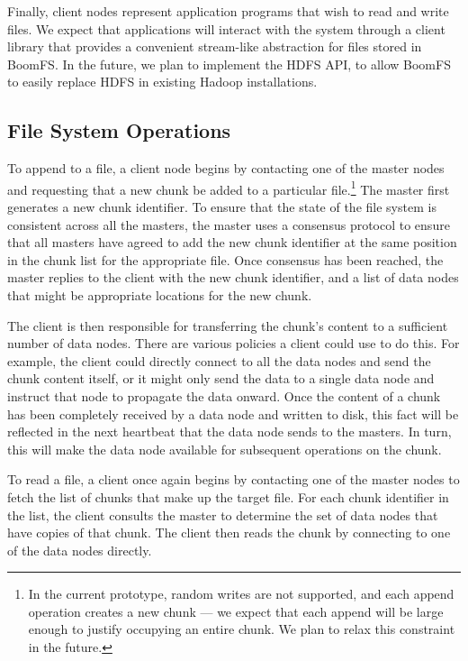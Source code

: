 \documentclass[twocolumn]{article}
\begin{document}
Finally, client nodes represent application programs that wish to read
and write files. We expect that applications will interact with the
system through a client library that provides a convenient stream-like
abstraction for files stored in BoomFS. In the future, we plan to
implement the HDFS API, to allow BoomFS to easily replace HDFS in
existing Hadoop installations.

\subsection{File System Operations}
\label{fs-ops}
To append to a file, a client node begins by contacting one of the
master nodes and requesting that a new chunk be added to a particular
file.\footnote{In the current prototype, random writes are not
  supported, and each append operation creates a new chunk --- we
  expect that each append will be large enough to justify occupying an
  entire chunk. We plan to relax this constraint in the future.} The
master first generates a new chunk identifier. To ensure that the
state of the file system is consistent across all the masters, the
master uses a consensus protocol to ensure that all masters have
agreed to add the new chunk identifier at the same position in the
chunk list for the appropriate file. Once consensus has been reached,
the master replies to the client with the new chunk identifier, and a
list of data nodes that might be appropriate locations for the new
chunk.

The client is then responsible for transferring the chunk's content to
a sufficient number of data nodes. There are various policies a client
could use to do this. For example, the client could directly connect
to all the data nodes and send the chunk content itself, or it might
only send the data to a single data node and instruct that node to
propagate the data onward. Once the content of a chunk has been
completely received by a data node and written to disk, this fact will
be reflected in the next heartbeat that the data node sends to the
masters. In turn, this will make the data node available for
subsequent operations on the chunk.

To read a file, a client once again begins by contacting one of the
master nodes to fetch the list of chunks that make up the target
file. For each chunk identifier in the list, the client consults the
master to determine the set of data nodes that have copies of that
chunk. The client then reads the chunk by connecting to one of the
data nodes directly.
\end{document}
